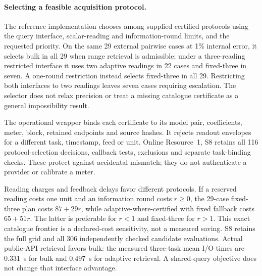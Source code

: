 \paragraph{Selecting a feasible acquisition protocol.}
The reference implementation chooses among supplied certified protocols
using the query interface, scalar-reading and information-round limits, and
the requested priority. On the same 29 external pairwise cases at 1\%
internal error, it selects bulk in all 29 when range retrieval is admissible;
under a three-reading restricted interface it uses two adaptive readings in
22 cases and fixed-three in seven. A one-round restriction instead selects
fixed-three in all 29. Restricting both interfaces to two readings leaves
seven cases requiring escalation. The selector does not relax precision or
treat a missing catalogue certificate as a general impossibility result.

The operational wrapper binds each certificate to its model pair,
coefficients, meter, block, retained endpoints and source hashes. It rejects
readout envelopes for a different task, timestamp, feed or unit. Online
Resource~1, S8 retains all 116 protocol-selection decisions, callback tests,
exclusions and separate task-binding checks. These protect against accidental
mismatch; they do not authenticate a provider or calibrate a meter.

Reading charges and feedback delays favor different protocols. If a reserved
reading costs one unit and an information round costs $r\geq0$, the 29-case
fixed-three plan costs $87+29r$, while adaptive-where-certified with fixed
fallback costs $65+51r$. The latter is preferable for $r<1$ and fixed-three
for $r>1$. This exact catalogue frontier is a declared-cost sensitivity,
not a measured saving. S8 retains the full grid and all 306 independently
checked candidate evaluations. Actual public-API retrieval favors bulk:
the measured three-task mean I/O times are 0.331~s for bulk and 0.497~s for
adaptive retrieval. A shared-query objective does not change that interface
advantage.
